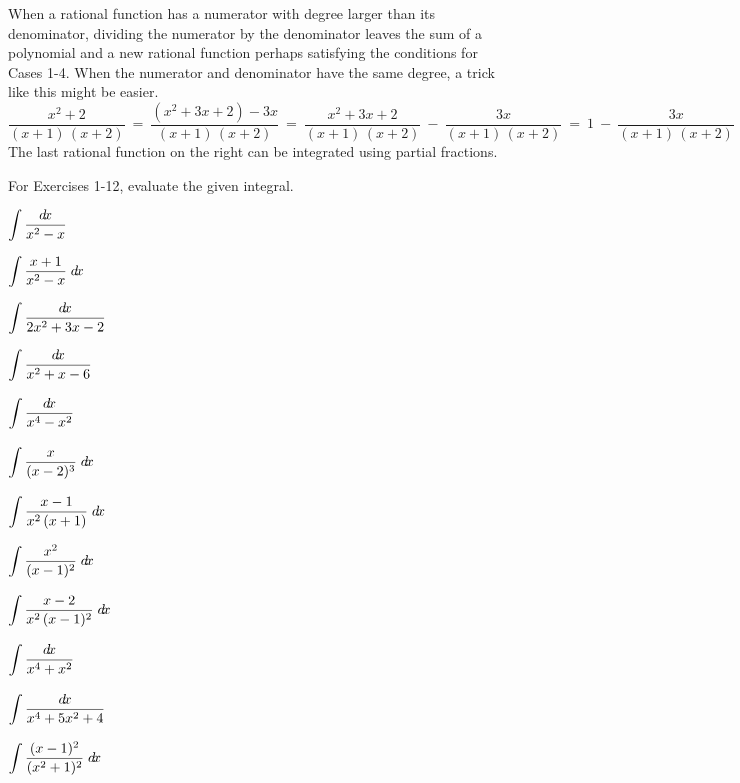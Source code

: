 When a rational function has a numerator with degree larger than its
denominator, dividing the numerator by the denominator leaves the sum of a
polynomial and a new rational function perhaps satisfying the conditions for
Cases 1-4. When the numerator and denominator have the same degree, a trick like
this might be easier.
\[
\frac{x^2 + 2}{(x+1)\,(x+2)} ~=~ \frac{(x^2 + 3x + 2) - 3x}{(x+1)\,(x+2)}
~=~ \frac{x^2 + 3x + 2}{(x+1)\,(x+2)} ~-~ \frac{3x}{(x+1)\,(x+2)}
~=~ 1 ~-~ \frac{3x}{(x+1)\,(x+2)}
\]
The last rational function on the right can be integrated using partial
fractions.
\newpage
\startexercises\label{sec6dot4}
{\small
{}
\par\noindent For Exercises 1-12, evaluate the given integral.
\begin{enumerate}[\bfseries 1.]
\begin{multicols}{4}
 \item $\displaystyle\int \frac{d\!x}{x^2 - x}$
 \item $\displaystyle\int \frac{x+1}{x^2 - x}\;d\!x$
 \item $\displaystyle\int \frac{d\!x}{2x^2 + 3x - 2}$
 \item $\displaystyle\int \frac{d\!x}{x^2 + x - 6}$
\end{multicols}
\begin{multicols}{4}
 \item $\displaystyle\int \frac{\dx}{x^4 - x^2}\vphantom{\displaystyle\int \frac{x^2}{(x-1)^2}}$
 \item $\displaystyle\int \frac{x}{(x - 2)^3}\;\dx\vphantom{\displaystyle\int \frac{x^2}{(x-1)^2}}$
 \item $\displaystyle\int \frac{x-1}{x^2\,(x+1)}\;\dx\vphantom{\displaystyle\int \frac{x^2}{(x-1)^2}}$
 \item $\displaystyle\int \frac{x^2}{(x-1)^2}\;d\!x$
\end{multicols}
\begin{multicols}{4}
 \item $\displaystyle\int \frac{x-2}{x^2\,(x-1)^2}\;\dx\vphantom{\displaystyle\int \frac{(x-1)^2}{(x^2 + 1)^2}}$
 \item $\displaystyle\int \frac{\dx}{x^4 + x^2}\vphantom{\displaystyle\int \frac{(x-1)^2}{(x^2 + 1)^2}}$
 \item $\displaystyle\int \frac{\dx}{x^4 + 5x^2 + 4}\vphantom{\displaystyle\int \frac{(x-1)^2}{(x^2 + 1)^2}}$
 \item $\displaystyle\int \frac{(x-1)^2}{(x^2 + 1)^2}\;d\!x$
\end{multicols}

\end{enumerate}}
